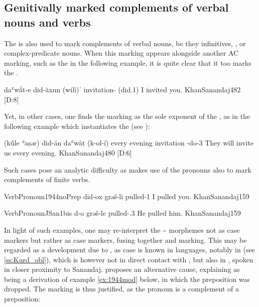 \subsection{Genitivally marked complements of verbal nouns and verbs} \label{ss:JSan_gen_verbal}

The  is also used to mark complements of verbal nouns, be they infinitives, , or complex-predicate nouns. When this marking appears alongside another AC marking, such as the \ez* in the following example, it is quite clear that it too marks the .

{daʿwắt-e did-ăxun (wilì)ˈ}
{invitation-\ez{} \pl{} (did.1\sg)}
{I invited you.}
{KhanSanandaj}{482 {[D:8]}}

Yet, in other cases, one finds the \gen* marking as the sole exponent of the , as in the following example which instantiates the  (see ):

{(kŭ́le ʾaṣər) did-án daʿwàt (k-ol-í)}
{every evening \pl{} invitation \ind-do-3\pl}
{They will invite us every evening.}
{KhanSanandaj}{480 {[D:6]}}

Such cases pose an analytic difficulty as \JSan makes use of the \gen* pronouns  also to mark complements of finite verbs. 

\acex
{Verb}{Pronoun}{1944noPrep}
{did-ox grəš-li}
{\masc{} pulled-1\sg}
{I pulled you.}
{KhanSanandaj}{159}

\acex
{Verb}{Pronoun}{JSan1bis}
{d-o grəš-le}
{\masc{} pulled-\agent.3\masc}
{He pulled him.}
{KhanSanandaj}{159}


In light of such examples, one may re-interpret the \D\~ morphemes not as \gen* case markers but rather as \obl* case markers, fusing together \acc* and \gen* marking. This may be regarded as a development due to , as \obl* case is known in  languages, notably in \Kur (see \ref{ss:Kurd_obl}), which is however not in direct contact with \JSan, but also in \Hawr \citep[13]{MacKenzieHawrami}, spoken in closer proximity to Sanandaj. \citet[158]{KhanSanandaj} proposes an alternative cause, explaining  as being a derivation of example \ref{ex:1944mod} below, in which the \acc* preposition  was dropped. The \gen* marking is thus justified, as the pronoun is a complement of a preposition:

